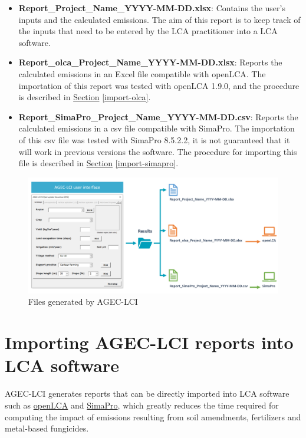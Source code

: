 \documentclass[openany]{book}
\begin{document}
\begin{itemize}
\item
  \textbf{Report\_Project\_Name\_YYYY-MM-DD.xlsx}: Contains the user's inputs and the calculated emissions. The aim of this report is to keep track of the inputs that need to be entered by the LCA practitioner into a LCA software.
\item
  \textbf{Report\_olca\_Project\_Name\_YYYY-MM-DD.xlsx}: Reports the calculated emissions in an Excel file compatible with openLCA. The importation of this report was tested with openLCA 1.9.0, and the procedure is described in \protect\hyperlink{import-olca}{Section} \ref{import-olca}.
\item
  \textbf{Report\_SimaPro\_Project\_Name\_YYYY-MM-DD.csv}: Reports the calculated emissions in a csv file compatible with SimaPro. The importation of this csv file was tested with SimaPro 8.5.2.2, it is not guaranteed that it will work in previous versions the software. The procedure for importing this file is described in \protect\hyperlink{import-simapro}{Section} \ref{import-simapro}.
\end{itemize}

\begin{figure}[ht]

{\centering \includegraphics[width=0.95\linewidth]{Figures/age_lci_user_interface} 

}

\caption{Files generated by AGEC-LCI}\label{fig:agec-lci-step4}
\end{figure}

\hypertarget{importing-agec-lci-reports-into-lca-software}{%
\chapter{Importing AGEC-LCI reports into LCA software}\label{importing-agec-lci-reports-into-lca-software}}

AGEC-LCI generates reports that can be directly imported into LCA software such as \href{http://www.openlca.org/openlca/}{openLCA} and \href{https://simapro.com/}{SimaPro}, which greatly reduces the time required for computing the impact of emissions resulting from soil amendments, fertilizers and metal-based fungicides.
\end{document}
